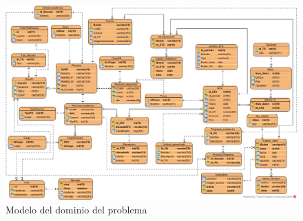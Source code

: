 \begin{figure}[htbp!]
	\begin{center}
		\includegraphics[angle=90,width=.80\textwidth]{images/DER}
		\caption{Modelo del dominio del problema}
		\label{fig:modeloDeDominio}
	\end{center}
\end{figure}

